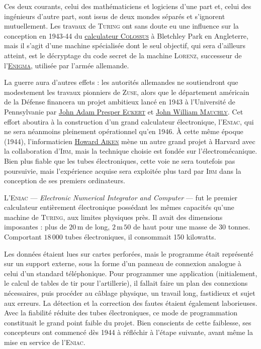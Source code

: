 Ces deux courants, celui des mathématiciens et logiciens d'une part et, celui des ingénieurs d'autre part, sont issus de deux mondes séparés et s’ignorent mutuellement. Les travaux de \textsc{Turing} ont sans doute eu une influence sur la conception en 1943-44 du \href{http://www.histoire-informatique.org/musee/2_3_2.html}{calculateur \textsc{Colossus}} à Bletchley Park en Angleterre, mais il s’agit d’une machine spécialisée dont le seul objectif, qui sera d’ailleurs atteint, est le décryptage du code secret de la machine \textsc{Lorenz}, successeur de l’\href{https://interstices.info/enigma/}{\textsc{Enigma}}, utilisée par l’armée allemande.

La guerre aura d’autres effets : les autorités allemandes ne soutiendront que modestement les travaux pionniers de \textsc{Zuse}, alors que le département américain de la Défense financera un projet ambitieux lancé en 1943 à l’Université de Pennsylvanie par \href{https://fr.wikipedia.org/wiki/John_Eckert}{John Adam Presper \textsc{Eckert}} et \href{https://fr.wikipedia.org/wiki/John_William_Mauchly}{John William \textsc{Mauchly}}. Cet effort aboutira à la construction d’un grand calculateur électronique, l’\textsc{Eniac}, qui ne sera néanmoins pleinement opérationnel qu’en 1946. À cette même époque (1944), l'informaticien \href{https://fr.wikipedia.org/wiki/Howard_Aiken}{Howard \textsc{Aiken}} mène un autre grand projet à Harvard avec la collaboration d’\textsc{Ibm}, mais la technique choisie est fondée sur l'électromécanique. Bien plus fiable que les tubes électroniques, cette voie ne sera toutefois pas poursuivie, mais l’expérience acquise sera exploitée plus tard par \textsc{Ibm} dans la conception de ses premiers ordinateurs.

L’\textsc{Eniac} --- \textit{Electronic Numerical Integrator and Computer} --- fut le premier calculateur entièrement électronique possédant les mêmes capacités qu’une machine de \textsc{Turing}, aux limites physiques près. Il avait des dimensions imposantes : plus de $20$\,m de long, $2$\,m\,$50$ de haut pour une masse de $30$ tonnes. Comportant $18\,000$ tubes électroniques, il consommait 150 kilowatts.

Les données étaient lues sur cartes perforées, mais le programme était représenté sur un support externe, sous la forme d’un panneau de connexion analogue à celui d’un standard téléphonique. Pour programmer une application (initialement, le calcul de tables de tir pour l’artillerie), il fallait faire un plan des connexions nécessaires, puis procéder au câblage physique, un travail long, fastidieux et sujet aux erreurs. La détection et la correction des fautes étaient également laborieuses. Avec la fiabilité réduite des tubes électroniques, ce mode de programmation constituait le grand point faible du projet. Bien conscients de cette faiblesse, ses concepteurs ont commencé dès 1944 à réfléchir à l’étape suivante, avant même la mise en service de l’\textsc{Eniac}.

